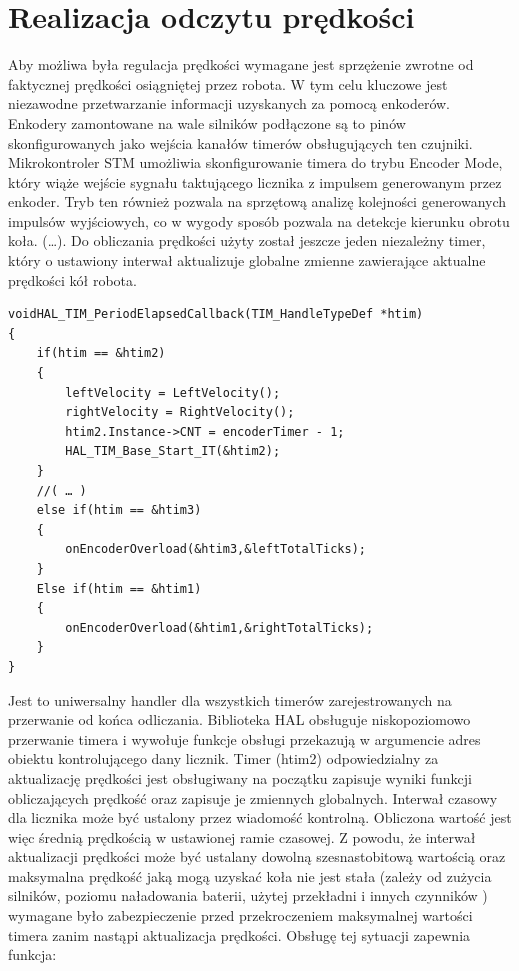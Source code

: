 \documentclass[eng,printmode]{mgr}
\begin{document}
 \section{Realizacja odczytu prędkości}

Aby możliwa była regulacja prędkości wymagane jest sprzężenie zwrotne od faktycznej prędkości osiągniętej przez robota. W tym celu kluczowe jest niezawodne przetwarzanie informacji uzyskanych za pomocą enkoderów. Enkodery zamontowane na wale silników podłączone są to pinów skonfigurowanych jako wejścia kanałów timerów obsługujących ten czujniki. Mikrokontroler STM umożliwia skonfigurowanie timera do trybu Encoder Mode, który wiąże wejście sygnału taktującego licznika z impulsem generowanym przez enkoder. Tryb ten również pozwala na sprzętową analizę kolejności generowanych impulsów wyjściowych, co w wygody sposób pozwala na detekcje kierunku obrotu koła.  (…). Do obliczania prędkości użyty został jeszcze jeden niezależny timer, który o ustawiony interwał aktualizuje globalne zmienne zawierające aktualne prędkości kół robota. 
\begin{lstlisting}[style=c]
voidHAL_TIM_PeriodElapsedCallback(TIM_HandleTypeDef *htim)
{
	if(htim == &htim2)
	{
		leftVelocity = LeftVelocity();
		rightVelocity = RightVelocity();
		htim2.Instance->CNT = encoderTimer - 1;
		HAL_TIM_Base_Start_IT(&htim2);
	}
	//( … )
	else if(htim == &htim3)
	{
		onEncoderOverload(&htim3,&leftTotalTicks);
	}
	Else if(htim == &htim1)
	{
		onEncoderOverload(&htim1,&rightTotalTicks);
	}	
}

\end{lstlisting}
Jest to uniwersalny handler dla wszystkich timerów zarejestrowanych na przerwanie od końca odliczania. Biblioteka HAL obsługuje niskopoziomowo przerwanie timera i wywołuje funkcje obsługi przekazują w argumencie adres obiektu kontrolującego dany licznik. Timer (htim2) odpowiedzialny  za aktualizację prędkości jest obsługiwany na początku zapisuje wyniki funkcji obliczających prędkość oraz zapisuje je zmiennych globalnych. Interwał czasowy dla licznika może być ustalony przez wiadomość kontrolną. Obliczona wartość  jest więc średnią prędkością w ustawionej ramie czasowej.  Z powodu, że interwał aktualizacji prędkości może być ustalany dowolną  szesnastobitową wartością oraz maksymalna prędkość jaką mogą uzyskać koła nie jest stała (zależy od zużycia silników, poziomu naładowania baterii, użytej przekładni i innych czynników ) wymagane było zabezpieczenie przed przekroczeniem maksymalnej wartości timera zanim nastąpi aktualizacja prędkości. Obsługę tej sytuacji zapewnia funkcja:
\end{document}
